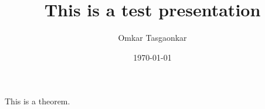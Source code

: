 \documentclass{beamer}
\title[Trying Beamer] %
{This is a test presentation}
\author[Omkar Tasgaonkar] %
{Omkar Tasgaonkar}
\date[\today] %
{\today}
\begin{document}
\begin{frame}
\titlepage
\end{frame}

\begin{frame}
\begin{theorem}
This is a theorem.
\end{theorem}
\end{frame}
\end{document}
